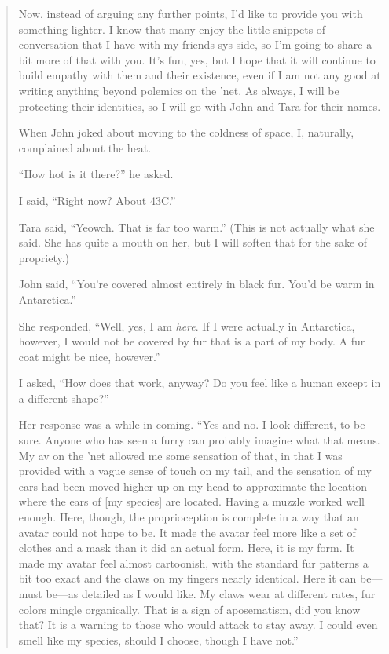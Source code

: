 \begin{quote}
Now, instead of arguing any further points, I'd like to provide you with something lighter. I know that many enjoy the little snippets of conversation that I have with my friends sys-side, so I'm going to share a bit more of that with you. It's fun, yes, but I hope that it will continue to build empathy with them and their existence, even if I am not any good at writing anything beyond polemics on the 'net. As always, I will be protecting their identities, so I will go with John and Tara for their names.

When John joked about moving to the coldness of space, I, naturally, complained about the heat.

``How hot is it there?'' he asked.

I said, ``Right now? About 43C.''

Tara said, ``Yeowch. That is far too warm.'' (This is not actually what she said. She has quite a mouth on her, but I will soften that for the sake of propriety.)

John said, ``You're covered almost entirely in black fur. You'd be warm in Antarctica.''

She responded, ``Well, yes, I am \emph{here}. If I were actually in Antarctica, however, I would not be covered by fur that is a part of my body. A fur coat might be nice, however.''

I asked, ``How does that work, anyway? Do you feel like a human except in a different shape?''

Her response was a while in coming. ``Yes and no. I look different, to be sure. Anyone who has seen a furry can probably imagine what that means. My av on the 'net allowed me some sensation of that, in that I was provided with a vague sense of touch on my tail, and the sensation of my ears had been moved higher up on my head to approximate the location where the ears of {[}my species{]} are located. Having a muzzle worked well enough. Here, though, the proprioception is complete in a way that an avatar could not hope to be. It made the avatar feel more like a set of clothes and a mask than it did an actual form. Here, it is my form. It made my avatar feel almost cartoonish, with the standard fur patterns a bit too exact and the claws on my fingers nearly identical. Here it can be---must be---as detailed as I would like. My claws wear at different rates, fur colors mingle organically. That is a sign of aposematism, did you know that? It is a warning to those who would attack to stay away. I could even smell like my species, should I choose, though I have not.''


\end{quote}
